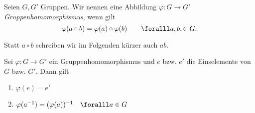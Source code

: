 \lecture

\begin{defn*}[Gruppenhomomorphismus] 
	Seien $ G,G' $ Gruppen. Wir nennen eine Abbildung $ \varphi: G \to G' $ \emph{Gruppenhomomorphismus}, wenn gilt
	\[ \varphi (a \circ b) = \varphi(a) \circ \varphi(b) \qquad \foralll a,b, \in G. \]
\end{defn*}

\begin{rem*}
	Statt $a \circ b$ schreiben wir im Folgenden kürzer auch $ab$.
\end{rem*}

\begin{lem}
	Sei $\varphi: G \to G'$ ein Gruppenhomomorphismus und $e$ bzw. $e'$ die Einselemente von $G$ bzw. $G'$. Dann gilt
	\begin{enumerate}[label=({\roman*})]
		\item $\varphi(e) = e'$
		\item $ \varphi(a^{-1}) = (\varphi(a))^{-1} \quad \foralll a \in G $
	\end{enumerate}
\end{lem}